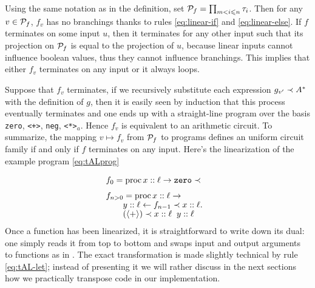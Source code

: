Using the same notation as in the definition, set
$\mathcal{P}_f=\prod_{m<i\leqslant n}\tau_i$. Then for any $v\in\mathcal{P}_f$,
$f_v$ has no branchings thanks to rules \eqref{eq:linear-if} and
\eqref{eq:linear-else}. If $f$ terminates on some input $u$, then it
terminates for any other input such that its projection on $\mathcal{P}_f$
is equal to the projection of $u$, because linear inputs cannot
influence boolean values, thus they cannot influence branchings. This
implies that either $f_v$ terminates on any input or it always
loops.

Suppose that $f_v$ terminates, if we recursively substitute each
expression $g_{v'}\prec A^\ast$ with the definition of $g$, then it is
easily seen by induction that this process eventually terminates and
one ends up with a straight-line program over the basis
\lstinline{zero}, \lstinline{<+>}, \lstinline{neg},
\lstinline{<*>}$_a$. Hence $f_v$ is equivalent to an arithmetic
circuit. To summarize, the mapping $v\mapsto f_v$ from $\mathcal{P}_f$ to
\tAL{} programs defines an uniform circuit family if and only if $f$
terminates on any input. Here's the linearization of the example
program \eqref{eq:tALprog}

\begin{align}
  &\begin{aligned}
    &f_0 = \operatorname{proc} x::\ell \rightarrow {\tt zero}\prec
  \end{aligned}\\[0.5ex]
  &\begin{aligned}
    &f_{n>0} = \operatorname{proc} x::\ell \rightarrow\\[-1ex]
    &\qquad y::\ell \leftarrow f_{n-1} \prec x::\ell.\\[-1ex]
    &\qquad (\langle+\rangle) \prec x::\ell \;\; y::\ell\\[-1ex]
  \end{aligned}
\end{align}


Once a function has been linearized, it is straightforward to write
down its dual: one simply reads it from top to bottom and swaps input
and output arguments to functions as in \cite{BoLeSc03}. The exact
transformation is made slightly technical by rule \eqref{eq:tAL-let};
instead of presenting it we will rather discuss in the next sections
how we practically transpose code in our implementation.

